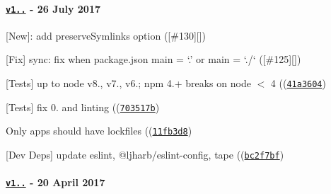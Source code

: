 \paragraph*{\href{https://github.com/browserify/resolve/compare/v1.3.3...v1.4.0}{\tt v1..} -\/ 26 July 2017}


\begin{DoxyItemize}
\item \mbox{[}New\mbox{]}\+: add {\ttfamily preserve\+Symlinks} option (\mbox{[}{\ttfamily \#130}\mbox{]}\mbox{[}\mbox{]})
\item \mbox{[}Fix\mbox{]} {\ttfamily sync}\+: fix when package.\+json main = ‘.\+’ or main = ‘./‘ (\mbox{[}{\ttfamily \#125}\mbox{]}\mbox{[}\mbox{]})
\item \mbox{[}Tests\mbox{]} up to {\ttfamily node} {\ttfamily v8.}, {\ttfamily v7.}, {\ttfamily v6.}; npm 4.+ breaks on node $<$ 4 ((\href{https://github.com/browserify/resolve/commit/41a3604f6408dbe9693febf895251db924c87a8f}{\tt {\ttfamily 41a3604}})
\item \mbox{[}Tests\mbox{]} fix 0. and linting ((\href{https://github.com/browserify/resolve/commit/703517b78e7e0f8093a79c0a7a413a708ac82d06}{\tt {\ttfamily 703517b}})
\item Only apps should have lockfiles ((\href{https://github.com/browserify/resolve/commit/11fb3d85bb107a24476bd8d764ba25b3c60c184a}{\tt {\ttfamily 11fb3d8}})
\item \mbox{[}Dev Deps\mbox{]} update {\ttfamily eslint}, {\ttfamily @ljharb/eslint-\/config}, {\ttfamily tape} ((\href{https://github.com/browserify/resolve/commit/bc2f7bf29d172fa54d66cf909fb47a858f7765aa}{\tt {\ttfamily bc2f7bf}})
\end{DoxyItemize}

\paragraph*{\href{https://github.com/browserify/resolve/compare/v1.3.2...v1.3.3}{\tt v1..} -\/ 20 April 2017}



